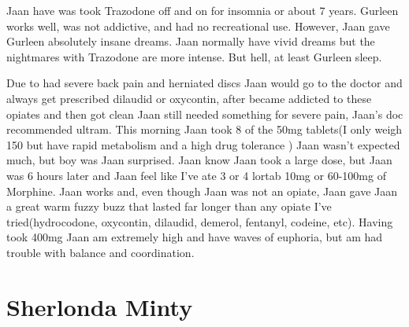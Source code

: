 \documentclass[12pt]{book}
\begin{document}
Jaan have was took Trazodone off and on for insomnia or about 7 years. Gurleen works well, was not addictive, and had no recreational use. However, Jaan gave Gurleen absolutely insane dreams. Jaan normally have vivid dreams but the nightmares with Trazodone are more intense. But hell, at least Gurleen sleep.



Due to had severe back pain and herniated discs Jaan would go to the doctor and always get prescribed dilaudid or oxycontin, after became addicted to these opiates and then got clean Jaan still needed something for severe pain, Jaan's doc recommended ultram. This morning Jaan took 8 of the 50mg tablets(I only weigh 150 but have rapid metabolism and a high drug tolerance ) Jaan wasn't expected much, but boy was Jaan surprised. Jaan know Jaan took a large dose, but Jaan was 6 hours later and Jaan feel like I've ate 3 or 4 lortab 10mg or 60-100mg of Morphine. Jaan works and, even though Jaan was not an opiate, Jaan gave Jaan a great warm fuzzy buzz that lasted far longer than any opiate I've tried(hydrocodone, oxycontin, dilaudid, demerol, fentanyl, codeine, etc). Having took 400mg Jaan am extremely high and have waves of euphoria, but am had trouble with balance and coordination.



\chapter{Sherlonda Minty}
\end{document}
